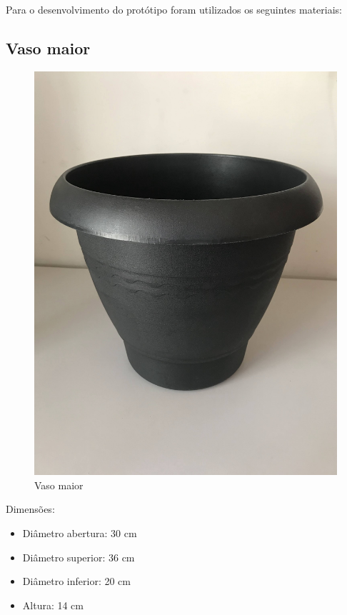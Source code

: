 \documentclass[
	12pt,				%
	openright,			%
	oneside,			%
	a4paper,			%
	chapter=TITLE,		%
	english,			%
	brazil				%
	]{abntex2}
\begin{document}
Para o desenvolvimento do protótipo foram utilizados os seguintes materiais:


\subsection{Vaso maior}

\begin{figure}[H]
    \centering
    \includegraphics[scale=0.04, angle=-90]{imagens/IMG_0598.jpg}
    \caption{Vaso maior}
    \label{fig:vasomaior}
\end{figure}        
Dimensões: 

\begin{itemize}
    \item Diâmetro abertura: 30 cm
    \item Diâmetro superior: 36 cm
    \item Diâmetro inferior: 20 cm
    \item Altura: 14 cm
\end{itemize}
\end{document}
